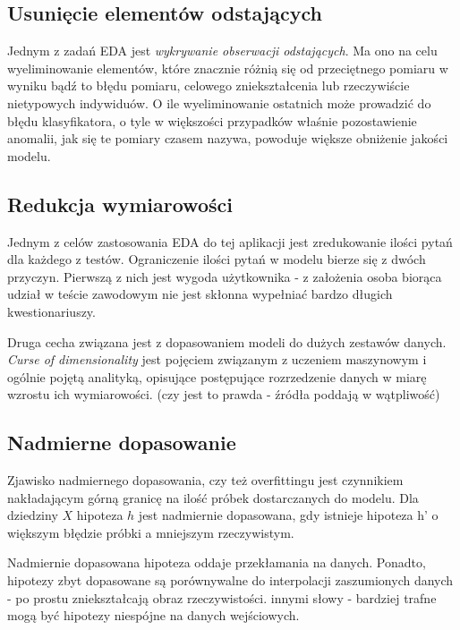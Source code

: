 \documentclass[12pt,a4paper,oneside]{report} %
\begin{document}
\subsection{Usunięcie elementów odstających}

Jednym z zadań EDA jest \emph{wykrywanie obserwacji odstających}. Ma ono na celu wyeliminowanie elementów, które znacznie różnią się od przeciętnego pomiaru w wyniku bądź to błędu pomiaru, celowego zniekształcenia lub rzeczywiście nietypowych indywiduów. O ile wyeliminowanie ostatnich może prowadzić do błędu klasyfikatora, o tyle w większości przypadków właśnie pozostawienie anomalii, jak się te pomiary czasem nazywa, powoduje większe obniżenie jakości modelu. \cite{dudek} \par

\subsection{Redukcja wymiarowości}

Jednym z celów zastosowania EDA do tej aplikacji jest zredukowanie ilości pytań dla każdego z testów. Ograniczenie ilości pytań w modelu bierze się z dwóch przyczyn. Pierwszą z nich jest wygoda użytkownika - z założenia osoba biorąca udział w teście zawodowym nie jest skłonna wypełniać bardzo długich kwestionariuszy.\par

Druga cecha związana jest z dopasowaniem modeli do dużych zestawów danych. \emph{Curse of dimensionality} jest pojęciem związanym z uczeniem maszynowym i ogólnie pojętą analityką, opisujące postępujące rozrzedzenie danych w miarę wzrostu ich wymiarowości. (czy jest to prawda - źródła poddają w wątpliwość)\par

\subsection{Nadmierne dopasowanie}

Zjawisko nadmiernego dopasowania, czy też overfittingu jest czynnikiem nakładającym górną granicę na ilość próbek dostarczanych do modelu. Dla dziedziny $X$ hipoteza $h$ jest nadmiernie dopasowana, gdy istnieje hipoteza h' o większym błędzie próbki a mniejszym rzeczywistym.\par

Nadmiernie dopasowana hipoteza oddaje przekłamania na danych. Ponadto, hipotezy zbyt dopasowane są porównywalne do interpolacji zaszumionych danych - po prostu zniekształcają obraz rzeczywistości. innymi słowy - bardziej trafne mogą być hipotezy niespójne na danych wejściowych.\par
\end{document}
